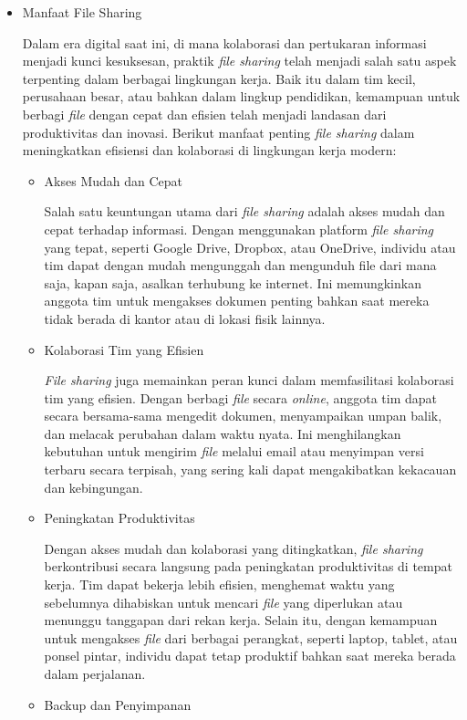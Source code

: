 \documentclass[12pt]{article}
\begin{document}
\begin{itemize}
    \item {Manfaat File Sharing} 
    
    Dalam era digital saat ini, di mana kolaborasi dan pertukaran informasi menjadi kunci kesuksesan, praktik \textit{file sharing} telah menjadi salah satu aspek terpenting dalam berbagai lingkungan kerja. Baik itu dalam tim kecil, perusahaan besar, atau bahkan dalam lingkup pendidikan, kemampuan untuk berbagi \textit{file} dengan cepat dan efisien telah menjadi landasan dari produktivitas dan inovasi.
    Berikut manfaat penting \textit{file sharing} dalam meningkatkan efisiensi dan kolaborasi di lingkungan kerja modern:
    \begin{itemize}
       \item Akses Mudah dan Cepat 
       
        Salah satu keuntungan utama dari \textit{file sharing} adalah akses mudah dan cepat terhadap informasi. Dengan menggunakan platform\textit{ file sharing} yang tepat, seperti Google Drive, Dropbox, atau OneDrive, individu atau tim dapat dengan mudah mengunggah dan mengunduh file dari mana saja, kapan saja, asalkan terhubung ke internet. Ini memungkinkan anggota tim untuk mengakses dokumen penting bahkan saat mereka tidak berada di kantor atau di lokasi fisik lainnya.
        \item Kolaborasi Tim yang Efisien

        \textit{File sharing} juga memainkan peran kunci dalam memfasilitasi kolaborasi tim yang efisien. Dengan berbagi \textit{file }secara \textit{online}, anggota tim dapat secara bersama-sama mengedit dokumen, menyampaikan umpan balik, dan melacak perubahan dalam waktu nyata. Ini menghilangkan kebutuhan untuk mengirim \textit{file} melalui email atau menyimpan versi terbaru secara terpisah, yang sering kali dapat mengakibatkan kekacauan dan kebingungan.
       \item Peningkatan Produktivitas 

       Dengan akses mudah dan kolaborasi yang ditingkatkan, \textit{file sharing} berkontribusi secara langsung pada peningkatan produktivitas di tempat kerja. Tim dapat bekerja lebih efisien, menghemat waktu yang sebelumnya dihabiskan untuk mencari \textit{file} yang diperlukan atau menunggu tanggapan dari rekan kerja. Selain itu, dengan kemampuan untuk mengakses \textit{file} dari berbagai perangkat, seperti laptop, tablet, atau ponsel pintar, individu dapat tetap produktif bahkan saat mereka berada dalam perjalanan.
       \item Backup dan Penyimpanan
       

\end{itemize}
\end{itemize}
\end{document}
